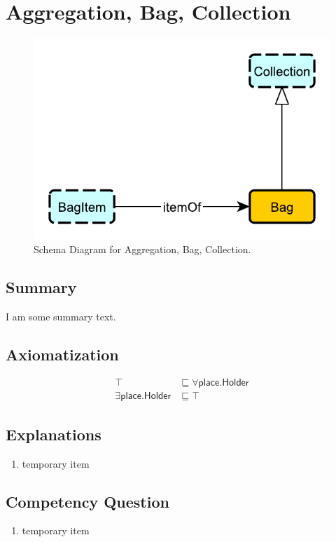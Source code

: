 \section{Aggregation, Bag, Collection}
\label{sec:Aggregation,}
\begin{figure}[h!]
\begin{center}
\includegraphics[width=.4\textwidth]{figures/aggregation}
\end{center}
\caption{Schema Diagram for Aggregation, Bag, Collection.}
\label{fig:Aggregation,}
\end{figure}
\subsection{Summary}
\label{sum:Aggregation,}
I am some summary text.

\subsection{Axiomatization}
\label{axs:Aggregation,}
\begin{align}
\top &\sqsubseteq \forall\textsf{place.Holder} \\ 
\exists\textsf{place.Holder} &\sqsubseteq \top 
\end{align}

\subsection{Explanations}
\label{exp:Aggregation,}
\begin{enumerate}
\item temporary item
\end{enumerate}

\subsection{Competency Question}
\label{cqs:Aggregation,}
\begin{enumerate}[CQ1.]
\item temporary item
\end{enumerate}

\newpage
